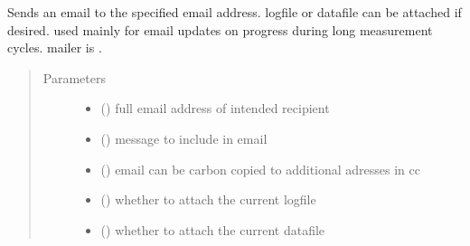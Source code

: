 \documentclass[letterpaper,10pt,english]{sphinxmanual}
\begin{document}

\begin{fulllineitems}
\label{\detokenize{source/laboratory.utils:laboratory.utils.notifications.send_email}}
Sends an email to the specified email address. logfile or datafile can
be attached if desired. used mainly for email updates on progress during
long measurement cycles. mailer is .
\begin{quote}\begin{description}
\item[{Parameters}] \leavevmode\begin{itemize}
\item {} 
 () \textendash{} full email address of intended recipient

\item {} 
 () \textendash{} message to include in email

\item {} 
 (\sphinxstyleliteralemphasis{\sphinxupquote{,}}) \textendash{} email can be carbon copied to additional adresses in cc

\item {} 
 () \textendash{} whether to attach the current logfile

\item {} 
 () \textendash{} whether to attach the current datafile

\end{itemize}

\end{description}\end{quote}

\end{fulllineitems}
\end{document}
